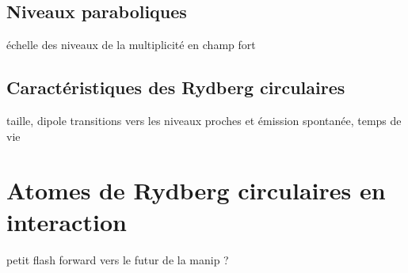 	\subsection*{Niveaux paraboliques}
		\noindent échelle des niveaux de la multiplicité en champ \og fort \fg{}
	\subsection*{Caractéristiques des Rydberg circulaires}
		\noindent taille, dipole
		\noindent transitions vers les niveaux proches et émission spontanée, temps de vie
	
	
	
\section{Atomes de Rydberg circulaires en interaction}
	\noindent petit flash forward vers le futur de la manip ?
